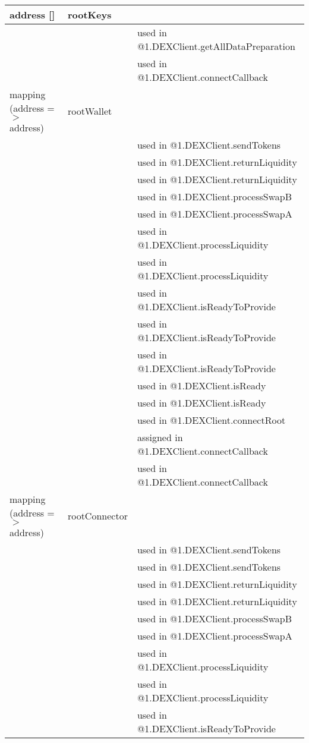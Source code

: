 \ifsoltables
\noindent\begin{tabular}{|l|l|p{5cm}|}\hline
address [] & rootKeys &  \\\hline
 & & used in @1.DEXClient.getAllDataPreparation\\\hline
 & & used in @1.DEXClient.connectCallback\\\hline
mapping (address =$>$ address) & rootWallet &  \\\hline
 & & used in @1.DEXClient.sendTokens\\\hline
 & & used in @1.DEXClient.returnLiquidity\\\hline
 & & used in @1.DEXClient.returnLiquidity\\\hline
 & & used in @1.DEXClient.processSwapB\\\hline
 & & used in @1.DEXClient.processSwapA\\\hline
 & & used in @1.DEXClient.processLiquidity\\\hline
 & & used in @1.DEXClient.processLiquidity\\\hline
 & & used in @1.DEXClient.isReadyToProvide\\\hline
 & & used in @1.DEXClient.isReadyToProvide\\\hline
 & & used in @1.DEXClient.isReadyToProvide\\\hline
 & & used in @1.DEXClient.isReady\\\hline
 & & used in @1.DEXClient.isReady\\\hline
 & & used in @1.DEXClient.connectRoot\\\hline
 & & assigned in @1.DEXClient.connectCallback\\\hline
 & & used in @1.DEXClient.connectCallback\\\hline
mapping (address =$>$ address) & rootConnector &  \\\hline
 & & used in @1.DEXClient.sendTokens\\\hline
 & & used in @1.DEXClient.sendTokens\\\hline
 & & used in @1.DEXClient.returnLiquidity\\\hline
 & & used in @1.DEXClient.returnLiquidity\\\hline
 & & used in @1.DEXClient.processSwapB\\\hline
 & & used in @1.DEXClient.processSwapA\\\hline
 & & used in @1.DEXClient.processLiquidity\\\hline
 & & used in @1.DEXClient.processLiquidity\\\hline
 & & used in @1.DEXClient.isReadyToProvide\\\hline

\end{tabular}
